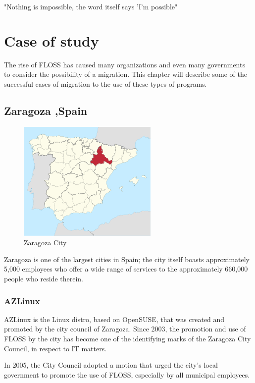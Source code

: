 \newpage
\begin{savequote}[108mm]
"Nothing is impossible, the word itself says 'I'm possible"
\end{savequote}
\chapter{Case of study}
\label{chap:Caseofstudy}
\vspace{-2cm}
The rise of FLOSS has caused many organizations and even many governments to consider the possibility of a migration. This chapter will describe some of the successful cases of migration to the use of these types of programs. 

\section {Zaragoza ,Spain}
\label{Zaragoza}

\begin{figure}[H]
\centering
    \includegraphics[scale=0.8]{img/Zaragoza.png} 
  \caption{ Zaragoza City}
    \end{figure}

Zaragoza is one of the largest cities in Spain; the city itself boasts approximately 5,000 employees who offer a wide range of services to the approximately 660,000 people who reside therein. 

\subsection{AZLinux}
AZLinux is the Linux distro, based on OpenSUSE, that was created and promoted by the city council of Zaragoza. Since 2003, the promotion and use of  FLOSS by the city has become one of the identifying marks of the Zaragoza City Council, in respect to IT matters.

In 2005, the City Council adopted a motion that urged the city’s local government to promote the use of  FLOSS, especially by all municipal employees. 

